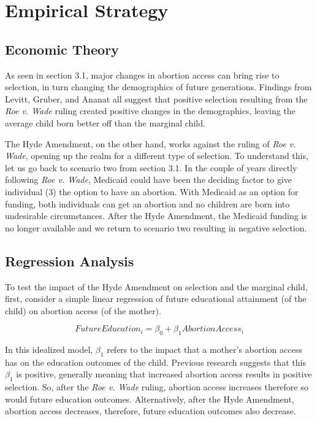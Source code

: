 \section{Empirical Strategy}
    \subsection{Economic Theory}
        As seen in section 3.1, major changes in abortion access can bring rise to selection, in turn changing the demographics of future generations. Findings from Levitt, Gruber, and Ananat all suggest that positive selection resulting from the \textit{Roe v. Wade} ruling created positive changes in the demographics, leaving the average child born better off than the marginal child.

        The Hyde Amendment, on the other hand, works against the ruling of \textit{Roe v. Wade}, opening up the realm for a different type of selection. To understand this, let us go back to scenario two from section 3.1. In the couple of years directly following \textit{Roe v. Wade}, Medicaid could have been the deciding factor to give individual (3) the option to have an abortion. With Medicaid as an option for funding, both individuals can get an abortion and no children are born into undesirable circumstances. After the Hyde Amendment, the Medicaid funding is no longer available and we return to scenario two resulting in negative selection.

    \subsection{Regression Analysis}
        To test the impact of the Hyde Amendment on selection and the marginal child, first, consider a simple linear regression of future educational attainment (of the child) on abortion access (of the mother).

            \begin{equation}\label{ideal}
                Future Education_{i} = \beta_{0} + \beta_{1}Abortion Access_{i}
            \end{equation}

        In this idealized model, $\beta_{1}$ refers to the impact that a mother's abortion access has on the education outcomes of the child. Previous research suggests that this $\beta_{1}$ is positive, generally meaning that increased abortion access results in positive selection. So, after the \textit{Roe v. Wade} ruling, abortion access increases therefore so would future education outcomes. Alternatively, after the Hyde Amendment, abortion access decreases, therefore, future education outcomes also decrease.

